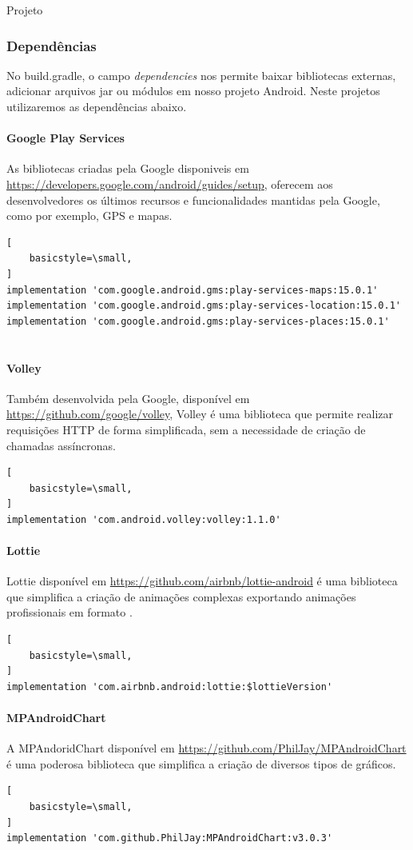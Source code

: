 \documentclass[
	12pt,				%
	openright,			%
	twoside,			%
	a4paper,			%
	english,			%
	french,				%
	spanish,			%
	brazil				%
	]{abntex2}
\begin{document}
\begin{chapter}{Projeto}
\subsubsection{Dependências}
 No build.gradle, o campo \textit{dependencies} nos permite baixar bibliotecas externas, adicionar arquivos jar ou módulos em nosso projeto Android. Neste projetos utilizaremos as dependências abaixo.
 
   \paragraph{Google Play Services}
   As bibliotecas criadas pela Google disponiveis em \url{https://developers.google.com/android/guides/setup}, oferecem aos desenvolvedores os últimos recursos e funcionalidades mantidas pela Google, como por exemplo, GPS e mapas.
       \begin{lstlisting}[
    basicstyle=\small,
] 
implementation 'com.google.android.gms:play-services-maps:15.0.1'
implementation 'com.google.android.gms:play-services-location:15.0.1'
implementation 'com.google.android.gms:play-services-places:15.0.1'
  
\end{lstlisting}
   \paragraph{Volley}
   Também desenvolvida pela Google, disponível em \url{https://github.com/google/volley}, Volley é uma biblioteca que permite realizar requisições HTTP de forma simplificada, sem a necessidade de criação de chamadas assíncronas.
       \begin{lstlisting}[
    basicstyle=\small,
]
implementation 'com.android.volley:volley:1.1.0'  
\end{lstlisting}

\paragraph{Lottie}
\label{Lottie}
   Lottie disponível em \url{https://github.com/airbnb/lottie-android} é uma  biblioteca que simplifica a criação de animações complexas exportando animações profissionais em formato .
        \begin{lstlisting}[
    basicstyle=\small,
] 
implementation 'com.airbnb.android:lottie:$lottieVersion'
\end{lstlisting}

   \paragraph{MPAndroidChart}
   A  MPAndoridChart disponível em \url{https://github.com/PhilJay/MPAndroidChart} é uma poderosa biblioteca que simplifica a criação de diversos tipos de gráficos. 
        \begin{lstlisting}[
    basicstyle=\small,
] 
implementation 'com.github.PhilJay:MPAndroidChart:v3.0.3'
  

\end{lstlisting}
\end{chapter}
\end{document}
